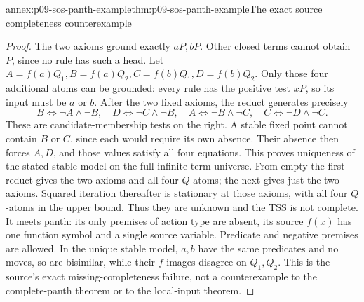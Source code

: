 \begin{annexitem}{annex:p09-sos-panth-example}{thm:p09-sos-panth-example}{The exact source completeness counterexample}
\begin{proof}
The two axioms ground exactly \(aP,bP\). Other closed terms
cannot obtain \(P\), since no rule has such a head. Let
\(A=f(a)Q_1,B=f(a)Q_2,C=f(b)Q_1,D=f(b)Q_2\).
Only those four additional atoms can be grounded: every rule has
the positive test \(xP\), so its input must be \(a\) or \(b\).
After the two fixed axioms, the reduct generates precisely
\[
 B\iff\neg A\land\neg B,\quad
 D\iff\neg C\land\neg B,\quad
 A\iff\neg B\land\neg C,\quad
 C\iff\neg D\land\neg C.
\]
These are candidate-membership tests on the right. A stable fixed
point cannot contain \(B\) or \(C\), since each would require
its own absence. Their absence then forces \(A,D\), and those
values satisfy all four equations. This proves uniqueness of the
stated stable model on the full infinite term universe.
From empty the first reduct gives the two axioms and all four
\(Q\)-atoms; the next gives just the two axioms. Squared
iteration thereafter is stationary at those axioms, with all four
\(Q\)-atoms in the upper bound. Thus they are unknown and
the TSS is not complete. It meets panth: its only premises of
action type are absent, its source \(f(x)\) has one function
symbol and a single source variable. Predicate and negative
premises are allowed. In the unique stable model, \(a,b\)
have the same predicates and no moves, so are bisimilar, while
their \(f\)-images disagree on \(Q_1,Q_2\). This is the
source's exact missing-completeness failure, not a counterexample
to the complete-panth theorem or to the local-input theorem.
\end{proof}
\end{annexitem}
